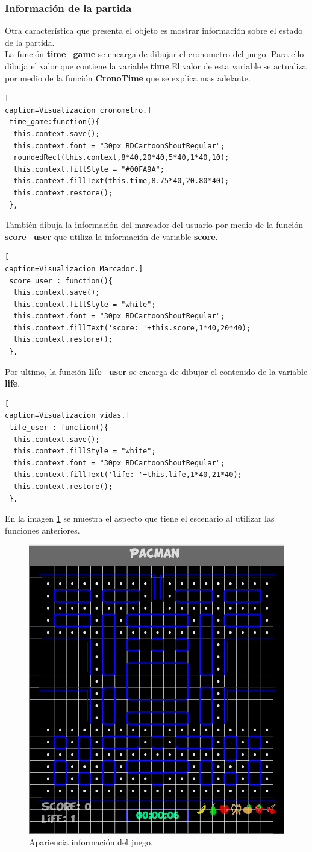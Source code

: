 \subsubsection*{Información de la partida}
Otra característica que presenta el objeto es mostrar información sobre el estado de la partida.
\\La función \textbf{time\_game} se encarga de dibujar el cronometro del juego. Para ello dibuja el valor que contiene la variable \textbf{time}.El valor de esta variable se actualiza por medio de la función \textbf{CronoTime} que se explica mas adelante.
\begin{lstlisting}[
caption=Visualizacion cronometro.]
 time_game:function(){
  this.context.save();
  this.context.font = "30px BDCartoonShoutRegular";	
  roundedRect(this.context,8*40,20*40,5*40,1*40,10);
  this.context.fillStyle = "#00FA9A";
  this.context.fillText(this.time,8.75*40,20.80*40);
  this.context.restore();
 },
 \end{lstlisting}
También dibuja la información del marcador del usuario por medio de la función \textbf{score\_user} que utiliza la información de variable \textbf{score}.
\begin{lstlisting}[
caption=Visualizacion Marcador.]
 score_user : function(){
  this.context.save();
  this.context.fillStyle = "white";
  this.context.font = "30px BDCartoonShoutRegular";
  this.context.fillText('score: '+this.score,1*40,20*40);
  this.context.restore();
 },
\end{lstlisting} 
Por ultimo, la función \textbf{life\_user} se encarga de dibujar el contenido de la variable \textbf{life}.
\begin{lstlisting}[
caption=Visualizacion vidas.]
 life_user : function(){
  this.context.save();
  this.context.fillStyle = "white";
  this.context.font = "30px BDCartoonShoutRegular";
  this.context.fillText('life: '+this.life,1*40,21*40);
  this.context.restore();
 },
\end{lstlisting}
En la imagen \ref{fig:InfoGame} se muestra el aspecto que tiene el escenario al utilizar las funciones anteriores.
\begin{figure}[!h]
\begin{center}
   \includegraphics[width=0.4\linewidth]{Figures/InfoGame}
	\decoRule
	\caption[Apariencia información del juego]{Apariencia información del juego.}
\label{fig:InfoGame}
\end{center}
\end{figure}
